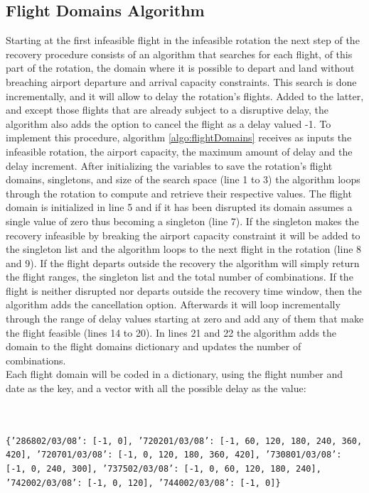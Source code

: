 
\subsection{Flight Domains Algorithm} \label{sec:flightDomains}
Starting at the first infeasible flight in the infeasible rotation the next step of the recovery procedure consists of an algorithm that searches for each flight, of this part of the rotation, the domain where it is possible to depart and land without breaching airport departure and arrival capacity constraints. This search is done incrementally, and it will allow to delay the rotation’s flights. Added to the latter, and except those flights that are already subject to a disruptive delay, the algorithm also adds the option to cancel the flight as a delay valued -1. To implement this procedure, algorithm \ref{algo:flightDomains} receives as inputs the infeasible rotation, the airport capacity, the maximum amount of delay and the delay increment. After initializing the variables to save the rotation's flight domains, singletons, and size of the search space (line 1 to 3) the algorithm loops through the rotation to compute and retrieve their respective values. The flight domain is initialized in line 5 and if it has been disrupted its domain assumes a single value of zero thus becoming a singleton (line 7). If the singleton makes the recovery infeasible by breaking the airport capacity constraint it will be added to the singleton list and the algorithm loops to the next flight in the rotation (line 8 and 9). If the flight departs outside the recovery the algorithm will simply return the flight ranges, the singleton list and the total number of combinations. If the flight is neither disrupted nor departs outside the recovery time window, then the algorithm adds the cancellation option. Afterwards it will loop incrementally through the range of delay values starting at zero and add any of them that make the flight feasible (lines 14 to 20). In lines 21 and 22 the algorithm adds the domain to the flight domains dictionary and updates the number of combinations. \\
Each flight domain will be coded in a dictionary, using the flight number and date as the key, and a vector with all the possible delay as the value:


{\texttt{\footnotesize \\ \\ \{'286802/03/08': [-1, 0],
		'720201/03/08': [-1, 60, 120, 180, 240, 360, 420],
		'720701/03/08': [-1, 0, 120, 180, 360, 420],
		'730801/03/08': [-1, 0, 240, 300],
		'737502/03/08': [-1, 0, 60, 120, 180, 240],
		'742002/03/08': [-1, 0, 120],
		'744002/03/08': [-1, 0]\}}}\\ \\	

